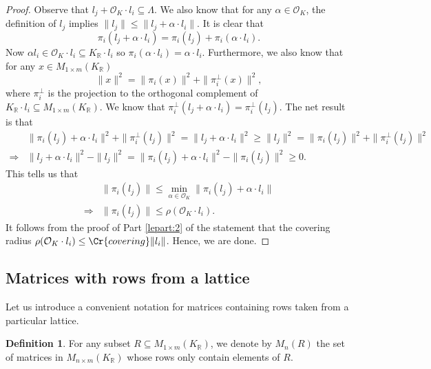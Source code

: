 \documentclass{amsart}
\theoremstyle{definition}
\newtheorem{definition}[theorem]{Definition}
\theoremstyle{remark}
\newcommand{\OK}{\mathcal{O}_K}
\newcommand{\KR}{K_\mathbb{R}}
\begin{document}
\begin{proof}
    Observe that $l_j + \OK \cdot l_i \subseteq \Lambda$. We also know that for any $\alpha \in \OK$,
    the definition of $l_j$ implies $\|l_j\| \leq \|l _j + \alpha \cdot l_i\|$.
    It is clear that 
    \begin{equation}
        \pi_{i}(l_j + \alpha  \cdot l_i) = \pi_{i}(l_j) +   \pi_{i}(\alpha \cdot l_{i}) .
    \end{equation}
    Now $\alpha l_{i} \in \OK \cdot l_{i} \subseteq K_\mathbb{R} \cdot l_{i}$ so $\pi_{i}(\alpha \cdot l_i) = \alpha \cdot l_{i}$. Furthermore, we also know that for any $x \in M_{1 \times m}(K_\mathbb{R})$
    \begin{equation}
        \|x\|^{2} = \|\pi_{i}(x)\|^{2} + \|\pi_{i}^{\perp}(x)\|^{2},
    \end{equation}
    where $\pi_{i}^{\perp}$ is the projection to the orthogonal complement of $K_\mathbb{R}\cdot l_{i} \subseteq M_{1 \times m}(K_\mathbb{R})$. 
    We know that $\pi_{i}^{\perp}(l_j + \alpha \cdot l_i) = \pi_{i}^{\perp}(l_j)$.
    The net result is that 
    \begin{align}
& \|\pi_{i}(l_j) + \alpha \cdot l_i \|^{2} +  \|\pi_{i}^{\perp}(l_j)\|^{2}    = \|l_j + \alpha \cdot l_i\|^{2} \geq  \|l_j\|^{2} = \|\pi_{i}(l_j)\|^{2} + \|\pi_{i}^{\perp}(l_j)\|^{2}\\
\Rightarrow
& \|l_j + \alpha \cdot l_i\|^{2} - \|l_j\|^{2} = \|\pi_{i}(l_j) + \alpha \cdot l_i\|^{2} - \|\pi_{i}(l_{j})\|^{2} \geq 0.
    \end{align}
    This tells us that
    \begin{align}
  & \|\pi_{i}(l_j)\| \leq \min_{\alpha \in \OK} \|\pi_{i}(l_j) + \alpha \cdot l_i\| \\
        \Rightarrow & \|\pi_{i}(l_j)\| \leq \rho( \OK \cdot l_i).
    \end{align}
    It follows 
    from the proof of Part \ref{lepart:2} of the statement
    that the covering radius $\rho(\OK \cdot l_i) \leq \Cr{covering} \|l_i\|$. Hence, we are done.
\end{proof}




\subsection{Matrices with rows from a lattice}
Let us introduce a convenient notation for matrices containing rows taken from a particular lattice.
\begin{definition}
    \label{de:defi_of_M_t}
    For any subset $R \subseteq M_{1 \times m}(K_\mathbb{R})$, we denote by $M_{n}(R)$ the set of matrices in $M_{n \times m}(\KR)$ whose rows only contain elements of $R$.
\end{definition}
\end{document}
